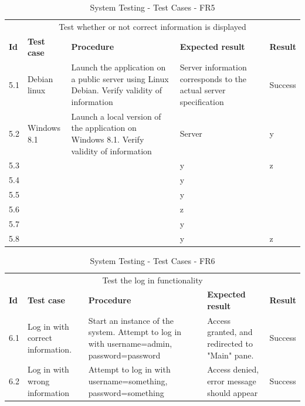 \begin{table}[ht!]
\begin{tabular}{|m{1cm}|m{2cm}|m{4cm}|m{3cm}|m{1cm}|}
\hline
\rowcolor{lightgray}
\multicolumn{5}{|c|}{\textbf{FR5, Information}} \\ \hline
\multicolumn{5}{|c|}{{Test whether or not correct information is displayed}} \\ \hline
\textbf{Id} & \textbf{Test case} & \textbf{Procedure} & \textbf{Expected result} & \textbf{Result} \\ \hline
5.1 & Debian linux & Launch the application on a public server using Linux Debian. Verify validity of information & Server information corresponds to the actual server specification & Success  \\ \hline
5.2 & Windows 8.1 & Launch a local version of the application on Windows 8.1. Verify validity of information & Server  &y \\ \hline
5.3 &&&y&z \\ \hline
5.4 &&&y& \\ \hline
5.5 &&&y& \\ \hline
5.6 &&&z& \\ \hline
5.7 &&&y& \\ \hline
5.8 &&&y&z \\ \hline
\end{tabular}
\caption{System Testing - Test Cases - FR5}
\label{table:system-testing-cases-fr5}
\end{table}

\begin{table}[ht!]
\begin{tabular}{|m{1cm}|m{2cm}|m{4cm}|m{3cm}|m{1cm}|}
\hline
\rowcolor{lightgray}
\multicolumn{5}{|c|}{\textbf{FR6, Log in}} \\ \hline
\multicolumn{5}{|c|}{{Test the log in functionality}} \\ \hline
\textbf{Id} & \textbf{Test case} & \textbf{Procedure} & \textbf{Expected result} & \textbf{Result} \\ \hline
6.1 & Log in with correct information. & Start an instance of the system. Attempt to log in with username=admin, password=password & Access granted, and redirected to "Main" pane. & Success \\ \hline
6.2 & Log in with wrong information & Attempt to log in with username=something, password=something & Access denied, error message should appear & Success \\ \hline

\end{tabular}
\caption{System Testing - Test Cases - FR6}
\label{table:system-testing-cases-fr6}
\end{table}


